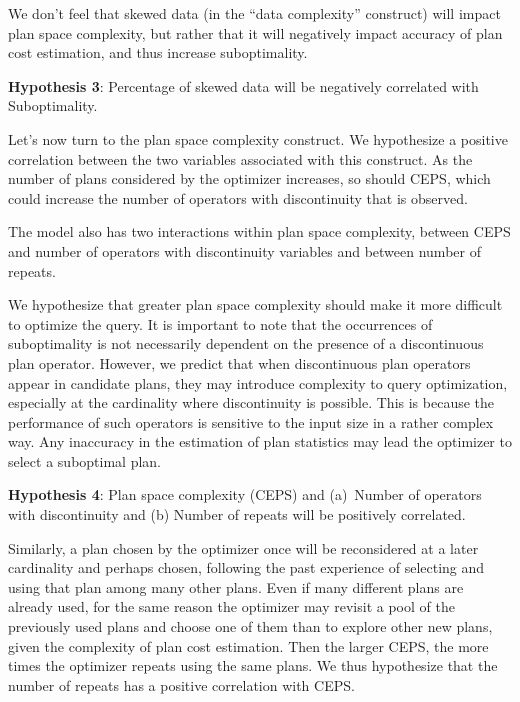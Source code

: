 \documentclass[prodmode,acmtods]{acmsmall}
\begin{document}
\vspace{0.6em}
We don't feel that skewed data (in the ``data complexity''
construct) will impact plan space
complexity, but rather that it will negatively impact accuracy of plan cost
estimation, and thus increase suboptimality.

\vspace{0.6em}\noindent
{\bf Hypothesis 3}: Percentage of skewed data will be negatively correlated with Suboptimality.

\vspace{0.6em}
Let's now turn to the plan space complexity construct. We hypothesize a positive
correlation between the two variables associated with this construct. As the
number of plans considered by the optimizer increases, so should CEPS, which
could increase the number of operators with discontinuity that is observed.

The model also has two interactions within plan space
complexity, between 
CEPS and number of operators with discontinuity variables and between number of repeats.

We hypothesize that greater plan space complexity should make it more
difficult to optimize the query.  It is important to note that the
occurrences of suboptimality is not necessarily dependent on the presence
of a discontinuous plan operator. However, we predict that when
discontinuous plan operators appear in candidate plans, they may introduce
complexity to query optimization, especially at the cardinality where
discontinuity is possible. This is because the performance of such operators
is sensitive to the input size in a rather complex way. Any inaccuracy in
the estimation of plan statistics may lead the optimizer to select a suboptimal
plan.

\vspace{0.6em}\noindent
{\bf Hypothesis 4}: Plan space complexity (CEPS) and (a)~Number of operators
with discontinuity and (b) Number of repeats will be positively correlated.

\vspace{0.6em}
Similarly, a plan chosen by the optimizer once will be reconsidered at a
later cardinality and perhaps chosen, following
the past experience of selecting and using that plan among many other plans.
Even if many different plans are already used, 
for the same reason the optimizer may revisit a pool of 
the previously used plans and choose one of them than to explore other new plans, 
given the complexity of plan cost estimation. 
Then the larger CEPS, the more times the optimizer repeats using the same plans. 
We thus hypothesize that the number of repeats has a positive correlation with CEPS. 
\end{document}
